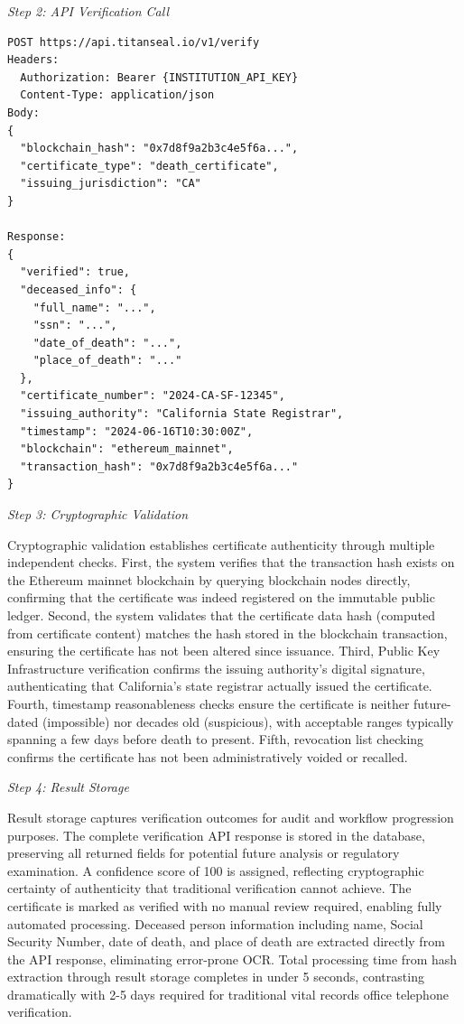 \textit{Step 2: API Verification Call}
\begin{verbatim}
POST https://api.titanseal.io/v1/verify
Headers:
  Authorization: Bearer {INSTITUTION_API_KEY}
  Content-Type: application/json
Body:
{
  "blockchain_hash": "0x7d8f9a2b3c4e5f6a...",
  "certificate_type": "death_certificate",
  "issuing_jurisdiction": "CA"
}

Response:
{
  "verified": true,
  "deceased_info": {
    "full_name": "...",
    "ssn": "...",
    "date_of_death": "...",
    "place_of_death": "..."
  },
  "certificate_number": "2024-CA-SF-12345",
  "issuing_authority": "California State Registrar",
  "timestamp": "2024-06-16T10:30:00Z",
  "blockchain": "ethereum_mainnet",
  "transaction_hash": "0x7d8f9a2b3c4e5f6a..."
}
\end{verbatim}

\textit{Step 3: Cryptographic Validation}

Cryptographic validation establishes certificate authenticity through multiple independent checks. First, the system verifies that the transaction hash exists on the Ethereum mainnet blockchain by querying blockchain nodes directly, confirming that the certificate was indeed registered on the immutable public ledger. Second, the system validates that the certificate data hash (computed from certificate content) matches the hash stored in the blockchain transaction, ensuring the certificate has not been altered since issuance. Third, Public Key Infrastructure verification confirms the issuing authority's digital signature, authenticating that California's state registrar actually issued the certificate. Fourth, timestamp reasonableness checks ensure the certificate is neither future-dated (impossible) nor decades old (suspicious), with acceptable ranges typically spanning a few days before death to present. Fifth, revocation list checking confirms the certificate has not been administratively voided or recalled.

\textit{Step 4: Result Storage}

Result storage captures verification outcomes for audit and workflow progression purposes. The complete verification API response is stored in the database, preserving all returned fields for potential future analysis or regulatory examination. A confidence score of 100 is assigned, reflecting cryptographic certainty of authenticity that traditional verification cannot achieve. The certificate is marked as verified with no manual review required, enabling fully automated processing. Deceased person information including name, Social Security Number, date of death, and place of death are extracted directly from the API response, eliminating error-prone OCR. Total processing time from hash extraction through result storage completes in under 5 seconds, contrasting dramatically with 2-5 days required for traditional vital records office telephone verification.

